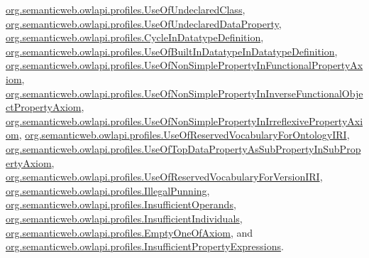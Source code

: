 \hyperlink{classorg_1_1semanticweb_1_1owlapi_1_1profiles_1_1_use_of_undeclared_class_ab1615000d596bc882f4547cb52284ee8}{org.\-semanticweb.\-owlapi.\-profiles.\-Use\-Of\-Undeclared\-Class}, \hyperlink{classorg_1_1semanticweb_1_1owlapi_1_1profiles_1_1_use_of_undeclared_data_property_aaae2ae27312da4cbfc33da393dc05469}{org.\-semanticweb.\-owlapi.\-profiles.\-Use\-Of\-Undeclared\-Data\-Property}, \hyperlink{classorg_1_1semanticweb_1_1owlapi_1_1profiles_1_1_cycle_in_datatype_definition_a43bdf676e9ba621f1a3711ee1b905f29}{org.\-semanticweb.\-owlapi.\-profiles.\-Cycle\-In\-Datatype\-Definition}, \hyperlink{classorg_1_1semanticweb_1_1owlapi_1_1profiles_1_1_use_of_built_in_datatype_in_datatype_definition_a243bbcc66632067b79d27d87c509e112}{org.\-semanticweb.\-owlapi.\-profiles.\-Use\-Of\-Built\-In\-Datatype\-In\-Datatype\-Definition}, \hyperlink{classorg_1_1semanticweb_1_1owlapi_1_1profiles_1_1_use_of_non_simple_property_in_functional_property_axiom_a7119fb87aa699b1fc8e991c69187d0fd}{org.\-semanticweb.\-owlapi.\-profiles.\-Use\-Of\-Non\-Simple\-Property\-In\-Functional\-Property\-Axiom}, \hyperlink{classorg_1_1semanticweb_1_1owlapi_1_1profiles_1_1_use_of_non_simple_property_in_inverse_functional_object_property_axiom_a40a16878f2e61c275ab5d8037691d4e1}{org.\-semanticweb.\-owlapi.\-profiles.\-Use\-Of\-Non\-Simple\-Property\-In\-Inverse\-Functional\-Object\-Property\-Axiom}, \hyperlink{classorg_1_1semanticweb_1_1owlapi_1_1profiles_1_1_use_of_non_simple_property_in_irreflexive_property_axiom_a3db9b216a1ead16f3b18efb583c79a3c}{org.\-semanticweb.\-owlapi.\-profiles.\-Use\-Of\-Non\-Simple\-Property\-In\-Irreflexive\-Property\-Axiom}, \hyperlink{classorg_1_1semanticweb_1_1owlapi_1_1profiles_1_1_use_of_reserved_vocabulary_for_ontology_i_r_i_a210e91e55556b2f9fae9923d2a67bfde}{org.\-semanticweb.\-owlapi.\-profiles.\-Use\-Of\-Reserved\-Vocabulary\-For\-Ontology\-I\-R\-I}, \hyperlink{classorg_1_1semanticweb_1_1owlapi_1_1profiles_1_1_use_of_top_data_property_as_sub_property_in_sub_property_axiom_af7f2dd39b81eab0ec12c3b98b9bcbf36}{org.\-semanticweb.\-owlapi.\-profiles.\-Use\-Of\-Top\-Data\-Property\-As\-Sub\-Property\-In\-Sub\-Property\-Axiom}, \hyperlink{classorg_1_1semanticweb_1_1owlapi_1_1profiles_1_1_use_of_reserved_vocabulary_for_version_i_r_i_a749abdd903cd9023f7e7fbffdb90caa0}{org.\-semanticweb.\-owlapi.\-profiles.\-Use\-Of\-Reserved\-Vocabulary\-For\-Version\-I\-R\-I}, \hyperlink{classorg_1_1semanticweb_1_1owlapi_1_1profiles_1_1_illegal_punning_a9ac3f5ffc8dd8ae9abf5045c0825f172}{org.\-semanticweb.\-owlapi.\-profiles.\-Illegal\-Punning}, \hyperlink{classorg_1_1semanticweb_1_1owlapi_1_1profiles_1_1_insufficient_operands_a506f572b5897e8fa67687658c11be0cc}{org.\-semanticweb.\-owlapi.\-profiles.\-Insufficient\-Operands}, \hyperlink{classorg_1_1semanticweb_1_1owlapi_1_1profiles_1_1_insufficient_individuals_a2b611c3b620f01e2d2cefd4274a267ec}{org.\-semanticweb.\-owlapi.\-profiles.\-Insufficient\-Individuals}, \hyperlink{classorg_1_1semanticweb_1_1owlapi_1_1profiles_1_1_empty_one_of_axiom_a67ef21f2fd1c604e757de9b973e181bf}{org.\-semanticweb.\-owlapi.\-profiles.\-Empty\-One\-Of\-Axiom}, and \hyperlink{classorg_1_1semanticweb_1_1owlapi_1_1profiles_1_1_insufficient_property_expressions_a19e172fc34dc452b905a902f0917b069}{org.\-semanticweb.\-owlapi.\-profiles.\-Insufficient\-Property\-Expressions}.
